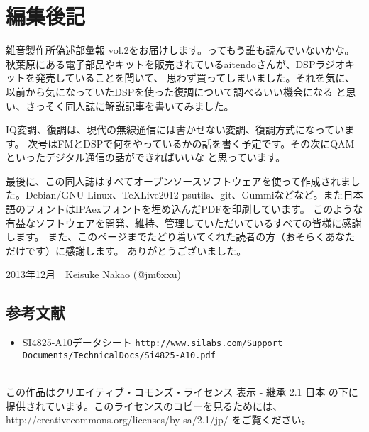 \section*{編集後記}
雑音製作所偽述部彙報 vol.2をお届けします。ってもう誰も読んでいないかな。
秋葉原にある電子部品やキットを販売されているaitendoさんが、DSPラジオキットを発売していることを聞いて、
思わず買ってしまいました。それを気に、以前から気になっていたDSPを使った復調について調べるいい機会になる
と思い、さっそく同人誌に解説記事を書いてみました。

IQ変調、復調は、現代の無線通信には書かせない変調、復調方式になっています。
次号はFMとDSPで何をやっているかの話を書く予定です。その次にQAMといったデジタル通信の話ができればいいな
と思っています。

最後に、この同人誌はすべてオープンソースソフトウェアを使って作成されました。Debian/GNU Linux、\TeX Live2012
psutils、git、Gummiなどなど。また日本語のフォントはIPAexフォントを埋め込んだPDFを印刷しています。
このような有益なソフトウェアを開発、維持、管理していただいているすべての皆様に感謝します。
また、このページまでたどり着いてくれた読者の方（おそらくあなただけです）に感謝します。
ありがとうございました。

\begin{flushright}
2013年12月　Keisuke Nakao (@jm6xxu) 
\end{flushright}

\subsection*{参考文献}
\begin{itemize}
  \item 
    SI4825-A10データシート \texttt{http://www.silabs.com/Support Documents/TechnicalDocs/Si4825-A10.pdf}
   \end{itemize}
\clearpage
\mbox{}
\vspace{36em}\\
この作品はクリエイティブ・コモンズ・ライセンス 表示 - 継承 2.1 日本 の下に提供されています。このライセンスのコピーを見るためには、http://creativecommons.org/licenses/by-sa/2.1/jp/ をご覧ください。
